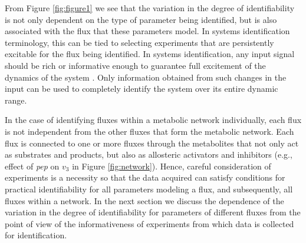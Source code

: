 \documentclass[10pt]{article}
\begin{document}
	From Figure \ref{fig:figure1} we see that the variation in the degree of identifiability is not only dependent on the type of parameter being identified, but is also associated with the flux that these parameters model.	In systems identification terminology, this can be tied to selecting experiments that are persistently excitable for the flux being identified. In systems identification, any input signal should be rich or informative enough to guarantee full excitement of the dynamics of the system \parencite{Ljung1994}. Only information obtained from such changes in the input can be used to completely identify the system over its entire dynamic range. %
	
	In the case of identifying fluxes within a metabolic network individually, each flux is not independent from the other fluxes that form the metabolic network. Each flux is connected to one or more fluxes through the metabolites that not only act as substrates and products, but also as allosteric activators and inhibitors (e.g., effect of \textit{pep} on $v_3$ in Figure \ref{fig:network}). Hence, careful consideration of experiments is a necessity so that the data acquired can satisfy conditions for practical identifiability for all parameters modeling a flux, and subsequently, all fluxes within a network. In the next section we discuss the dependence of the variation in the degree of identifiability for parameters of different fluxes from the point of view of the informativeness of experiments from which data is collected for identification.
	
\end{document}
